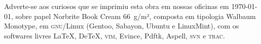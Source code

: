 \pagebreak
\ifodd\thepage\blank\else\relax\fi

\thispagestyle{empty}
\mbox{}\vfill

\begin{adjustwidth}{.15\textwidth}{.15\textwidth}
{\noindent\centering\footnotesize
Adverte-se aos curiosos que se imprimiu esta obra em nossas oficinas em \today,
sobre papel Norbrite Book Cream 66~g/m², composta em tipologia Walbaum Monotype, em
\textsc{gnu}/Linux (Gentoo, Sabayon, Ubuntu e LinuxMint), com os softwares livres \LaTeX,
De\TeX, \textsc{vim}, Evince, Pdftk, Aspell, \textsc{svn} e \textsc{trac}.\par}
\end{adjustwidth}

